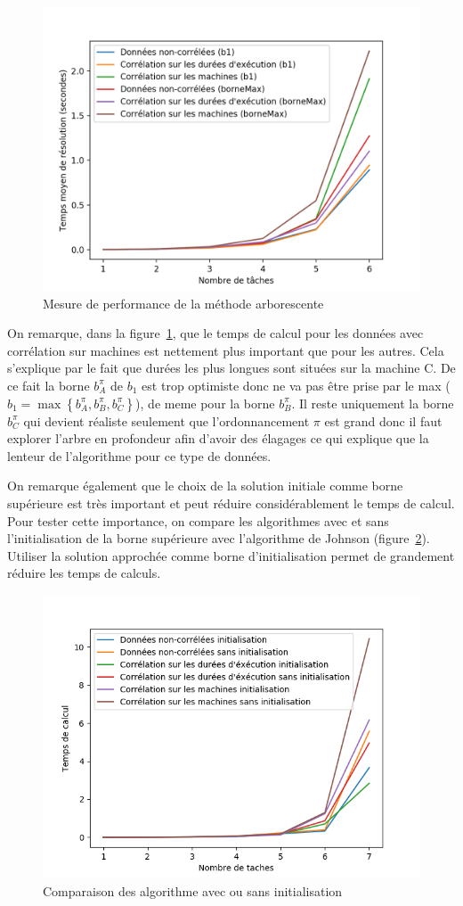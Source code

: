 \documentclass[a4paper, 10pt]{article}
\begin{document}
		\begin{figure}[h]
			\centering
			\includegraphics[width=0.75\linewidth]{graphes/time_exact_20iter_b1bmax.png}
			\caption{Mesure de performance de la méthode arborescente}
			\label{fig:temps_exact}
		\end{figure}
		
	        On remarque, dans la figure~\ref{fig:temps_exact}, que le temps de calcul pour les données avec corrélation sur machines est nettement plus important que pour les autres. Cela s'explique par le fait que durées les plus longues sont situées sur la machine C. De ce fait la borne $b^\pi_A$ de $b_1$ est trop optimiste donc ne va pas être prise par le max ($b_1 = \max\left\{b^\pi_A, b^\pi_B, b^\pi_C\right\}$), de meme pour la borne $b^\pi_B$. Il reste uniquement la borne $b^\pi_C$ qui devient réaliste seulement que l'ordonnancement $\pi$ est grand donc il faut explorer l'arbre en profondeur afin d'avoir des élagages ce qui explique que la lenteur de l'algorithme pour ce type de données.
		
		On remarque également que le choix de la solution initiale comme borne supérieure est très important et peut réduire considérablement le temps de calcul. Pour tester cette importance, on compare les algorithmes avec et sans l'initialisation de la borne supérieure avec l'algorithme de Johnson (figure~\ref{fig:init}). Utiliser la solution approchée comme borne d'initialisation permet de grandement réduire les temps de calculs.
		
		\begin{figure}[H]
			\centering
			\includegraphics[width=0.75\linewidth]{graphes/initialisation.png}
			\caption{Comparaison des algorithme avec ou sans initialisation}
			\label{fig:init}
		  \end{figure}
\end{document}

